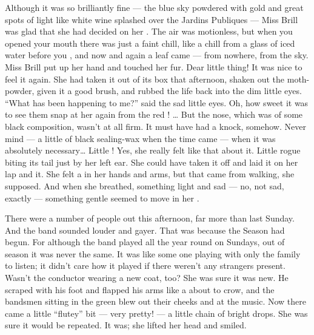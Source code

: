 \documentclass{fiche}
\begin{document}
\begin{texte}
Although it was so brilliantly fine --- the blue sky powdered with gold and great spots of
light like white wine splashed over the Jardins Publiques --- Miss Brill was glad that she had
decided on her . The air was motionless, but
when you opened your mouth there was just a faint chill, like a chill from a glass of iced
water before you , and now and again a leaf came
 --- from nowhere, from the sky. Miss Brill put up her
hand and touched her fur. Dear little thing! It was nice to feel it again. She had taken it
out of its box that afternoon, shaken out the moth-powder, given it a good brush, and rubbed
the life back into the dim little eyes. ``What has been happening to me?'' said the sad little
eyes. Oh, how sweet it was to see them snap at her again from the red
! \ldots{} But the nose, which was of some black
composition, wasn't at all firm. It must have had a knock, somehow. Never mind --- a little
 of black sealing-wax when the time came --- when it was
absolutely necessary\ldots{} Little ! Yes, she really felt like
that about it. Little rogue biting its tail just by her left ear. She could have taken it off
and laid it on her lap and  it. She felt a
 in her hands and arms, but that came from walking,
she supposed. And when she breathed, something light and sad --- no, not sad, exactly ---
something gentle seemed to move in her .

There were a number of people out this afternoon, far more than last Sunday. And the band
sounded louder and gayer. That was because the Season had begun. For although the band played
all the year round on Sundays, out of season it was never the same. It was like some one
playing with only the family to listen; it didn't care how it played if there weren't any
strangers present. Wasn't the conductor wearing a new coat, too? She was sure it was new. He
scraped with his foot and flapped his arms like a  about to
crow, and the bandsmen sitting in the green  blew
out their cheeks and  at the music. Now there
came a little ``flutey'' bit --- very pretty! --- a little chain of bright drops. She was sure
it would be repeated. It was; she lifted her head and smiled.


\end{texte}
\end{document}
